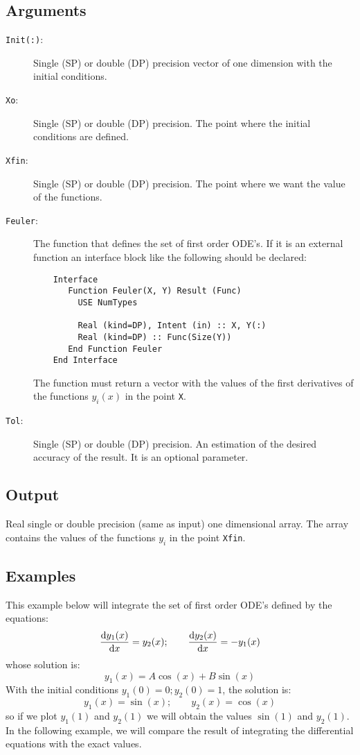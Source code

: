 \subsection{Arguments}

\begin{description}
\item[\texttt{Init(:)}:] Single (SP) or double (DP) precision vector of
  one dimension with the initial conditions.
\item[\texttt{Xo}:] Single (SP) or double (DP) precision. The point
  where the initial conditions are defined.
\item[\texttt{Xfin}:] Single (SP) or double (DP) precision. The point
  where we want the value of the functions.
\item[\texttt{Feuler}:] The function that defines the set of first order
  ODE's. If it is an external function an interface block like the
  following should be declared: 
\begin{verbatim}
    Interface
       Function Feuler(X, Y) Result (Func)
         USE NumTypes

         Real (kind=DP), Intent (in) :: X, Y(:)
         Real (kind=DP) :: Func(Size(Y))
       End Function Feuler
    End Interface
\end{verbatim}
The function must return a vector with the values of the first
derivatives of the functions $y_i(x)$ in the point \texttt{X}.
\item[\texttt{Tol}:] Single (SP) or double (DP) precision. An
  estimation of the desired accuracy of the result. It is an optional
  parameter.
\end{description}

\subsection{Output}

Real single or double precision (same as input) one dimensional
array. The array contains the values of the functions $y_i$ in the
point \texttt{Xfin}. 


\subsection{Examples}

This example below will integrate the set of first order ODE's defined
by the equations:
\begin{displaymath}
  \frac{\mathrm{d} y_1(x)}{\mathrm{d} x} = y_2(x);\qquad
  \frac{\mathrm{d} y_2(x)}{\mathrm{d} x} = -y_1(x)    
\end{displaymath}
whose solution is:
\begin{displaymath}
  y_1(x) = A\cos(x) + B\sin(x)
\end{displaymath}
With the initial conditions $y_1(0) = 0; y_2(0)=1$, the solution is:
\begin{displaymath}
  y_1(x) = \sin(x);\qquad y_2(x) = \cos(x)
\end{displaymath}
so if we plot $y_1(1)$ and $y_2(1)$ we will obtain the values
$\sin(1)$ and $y_2(1)$. In the following example, we will compare the
result of integrating the differential equations with the exact values.

